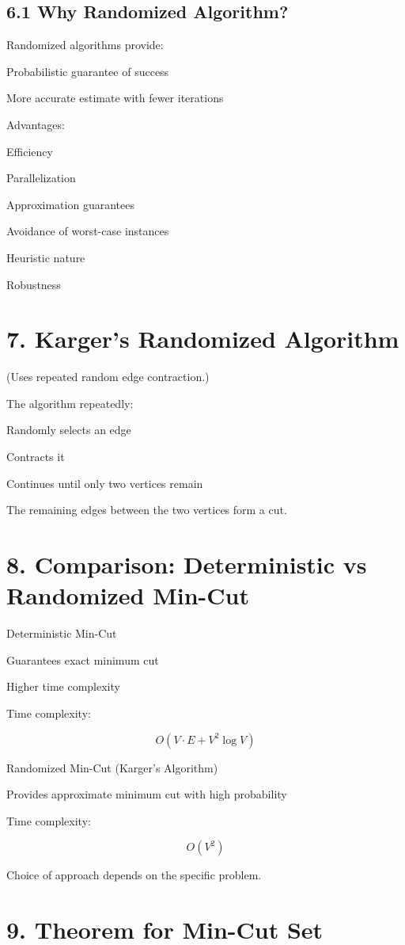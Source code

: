 \documentclass[12pt]{article}
\begin{document}
\subsection*{6.1 Why Randomized Algorithm?}

Randomized algorithms provide:

Probabilistic guarantee of success

More accurate estimate with fewer iterations

Advantages:

Efficiency

Parallelization

Approximation guarantees

Avoidance of worst-case instances

Heuristic nature

Robustness

\section*{7. Karger’s Randomized Algorithm}

(Uses repeated random edge contraction.)

The algorithm repeatedly:

Randomly selects an edge

Contracts it

Continues until only two vertices remain

The remaining edges between the two vertices form a cut.

\section*{8. Comparison: Deterministic vs Randomized Min-Cut}

Deterministic Min-Cut

Guarantees exact minimum cut

Higher time complexity

Time complexity:

\[
O(V \cdot E + V^2 \log V)
\]

Randomized Min-Cut (Karger’s Algorithm)

Provides approximate minimum cut with high probability

Time complexity:

\[
O(V^2)
\]

Choice of approach depends on the specific problem.

\section*{9. Theorem for Min-Cut Set}
\end{document}
